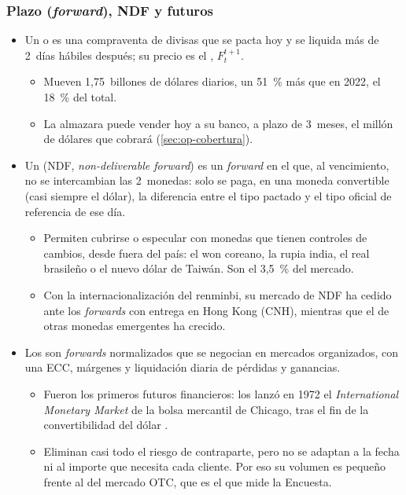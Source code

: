 \documentclass[11pt]{article}
\begin{document}
\subsubsection{Plazo (\emph{forward}), NDF y futuros}\label{sec:forward}

\begin{itemize}
\item Un  o  es una compraventa de divisas que se pacta hoy y se liquida más de 2~días hábiles después; su precio es el , $F_t^{t+1}$.
  \begin{itemize}
  \item Mueven 1,75~billones de dólares diarios, un 51~\% más que en 2022, el 18~\% del total\nocite{HuangKrohnSushko2025FX}.
  \item La almazara puede vender hoy a su banco, a plazo de 3~meses, el millón de dólares que cobrará (\ref{sec:op-cobertura}).
  \end{itemize}
\item Un  (NDF, \emph{non-deliverable forward}) es un \emph{forward} en el que, al vencimiento, no se intercambian las 2~monedas: solo se paga, en una moneda convertible (casi siempre el dólar), la diferencia entre el tipo pactado y el tipo oficial de referencia de ese día.
  \begin{itemize}
  \item Permiten cubrirse o especular con monedas que tienen controles de cambios, desde fuera del país: el won coreano, la rupia india, el real brasileño o el nuevo dólar de Taiwán. Son el 3,5~\% del mercado\nocite{BIS2026TrienalDatos}.
  \item Con la internacionalización del renminbi, su mercado de NDF ha cedido ante los \emph{forwards} con entrega en Hong Kong (CNH), mientras que el de otras monedas emergentes ha crecido\nocite{McCauleyShu2016NDF}.
  \end{itemize}
\item Los  son \emph{forwards} normalizados que se negocian en mercados organizados, con una ECC, márgenes y liquidación diaria de pérdidas y ganancias.
  \begin{itemize}
  \item Fueron los primeros futuros financieros: los lanzó en 1972 el \emph{International Monetary Market} de la bolsa mercantil de Chicago, tras el fin de la convertibilidad del dólar\nocite{Chalupa1982Currency} .
  \item Eliminan casi todo el riesgo de contraparte, pero no se adaptan a la fecha ni al importe que necesita cada cliente. Por eso su volumen es pequeño frente al del mercado OTC, que es el que mide la Encuesta.
  \end{itemize}
\end{itemize}
\end{document}
